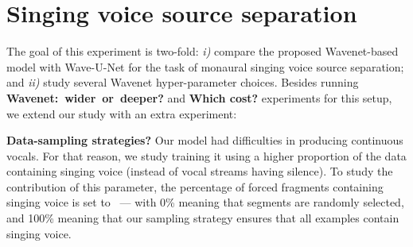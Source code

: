 \documentclass[a4paper]{article}
\begin{document}
\vspace{-1mm}
\section{Singing voice source separation}

The goal of this experiment is two-fold: \textit{i)} compare the proposed Wavenet-based model with Wave-U-Net for the task of monaural singing voice source separation; and  \textit{ii)} study several Wavenet hyper-parameter choices. Besides running \mbox{\textbf{Wavenet: wider or deeper?}} and \textbf{Which cost?} experiments for this setup, we extend our study with an extra experiment:

\noindent \textbf{Data-sampling strategies?} 
Our model had difficulties in producing continuous vocals. For that reason, we study training it using a higher proportion of the data containing singing voice (instead of vocal streams having silence). To study the contribution of this parameter, the percentage of forced fragments containing singing voice is set to~ --- with 0\% meaning that segments are randomly selected, and 100\% meaning that our sampling strategy ensures that all examples contain singing voice.
\end{document}
